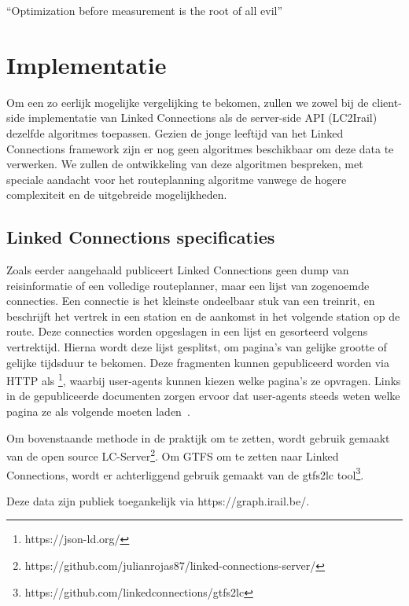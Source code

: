 \begin{savequote}[0.55\linewidth]
	``Optimization before measurement is the root of all evil''
\end{savequote}

\chapter{Implementatie}
\label{chap:implementatie}

Om een zo eerlijk mogelijke vergelijking te bekomen, zullen we zowel bij de client-side implementatie van Linked Connections als de server-side API (LC2Irail) dezelfde algoritmes toepassen. Gezien de jonge leeftijd van het Linked Connections framework zijn er nog geen algoritmes beschikbaar om deze data te verwerken. We zullen de ontwikkeling van deze algoritmen bespreken, met speciale aandacht voor het routeplanning algoritme vanwege de hogere complexiteit en de uitgebreide mogelijkheden.

\section{Linked Connections specificaties}
\label{sec:lcformaat}
Zoals eerder aangehaald publiceert Linked Connections geen dump van reisinformatie of een volledige routeplanner, maar een lijst van zogenoemde connecties. Een connectie is het kleinste ondeelbaar stuk van een treinrit, en beschrijft het vertrek in een station en de aankomst in het volgende station op de route. Deze connecties worden opgeslagen in een lijst en gesorteerd volgens vertrektijd. Hierna wordt deze lijst gesplitst, om pagina's van gelijke grootte of gelijke tijdsduur te bekomen. Deze fragmenten kunnen gepubliceerd worden via HTTP als \footnote{https://json-ld.org/}, waarbij user-agents kunnen kiezen welke pagina's ze opvragen. Links in de gepubliceerde documenten zorgen ervoor dat user-agents steeds weten welke pagina ze als volgende moeten laden~\citep{linkedconnections18}.

Om bovenstaande methode in de praktijk om te zetten, wordt gebruik gemaakt van de open source LC-Server\footnote{https://github.com/julianrojas87/linked-connections-server/}. Om GTFS om te zetten naar Linked Connections, wordt er achterliggend gebruik gemaakt van de gtfs2lc tool\footnote{https://github.com/linkedconnections/gtfs2lc}.

Deze data zijn publiek toegankelijk via https://graph.irail.be/.

